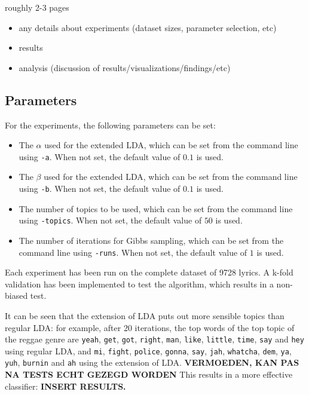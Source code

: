 roughly 2-3 pages
\begin{itemize}
\item any details about experiments (dataset sizes, parameter selection, etc)
\item results
\item analysis (discussion of results/visualizations/findings/etc)
\end{itemize}

\subsection{Parameters}
For the experiments, the following parameters can be set:
\begin{itemize}
\item The $\alpha$ used for the extended LDA, which can be set from the command line using \verb|-a|. When not set, the default value of $0.1$ is used.
\item The $\beta$ used for the extended LDA, which can be set from the command line using \verb|-b|. When not set, the default value of $0.1$ is used.
\item The number of topics to be used, which can be set from the command line using \verb|-topics|. When not set, the default value of $50$ is used.
\item The number of iterations for Gibbs sampling, which can be set from the command line using \verb|-runs|. When not set, the default value of $1$ is used.
\end{itemize}

Each experiment has been run on the complete dataset of 9728 lyrics. A k-fold validation has been implemented to test the algorithm, which results in a non-biased test. 


It can be seen that the extension of LDA puts out more sensible topics than regular LDA: for example, after 20 iterations, the top words of the top topic of the reggae genre are \verb|yeah|, \verb|get|, \verb|got|, \verb|right|, \verb|man|, \verb|like|, \verb|little|, \verb|time|, \verb|say| and \verb|hey| using regular LDA, and \verb|mi|, \verb|fight|, \verb|police|, \verb|gonna|, \verb|say|, \verb|jah|, \verb|whatcha|, \verb|dem|, \verb|ya|, \verb|yuh|, \verb|burnin| and \verb|ah| using the extension of LDA. \textbf{VERMOEDEN, KAN PAS NA TESTS ECHT GEZEGD WORDEN} This results in a more effective classifier: \textbf{INSERT RESULTS.}


